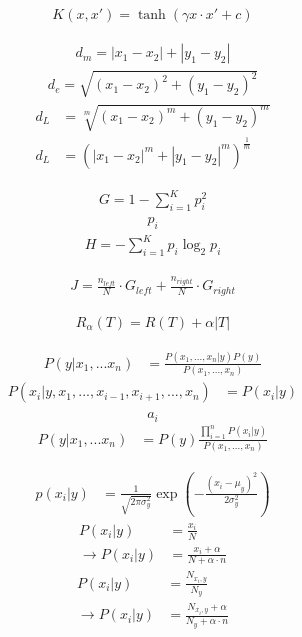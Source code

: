 \documentclass[USenglish,final,authoryear,12pt]{article}
\begin{document}
\begin{align*}
	K(x, x') = \tanh(\gamma x\cdot x' + c)
\end{align*}

\begin{align*}
	d_m = |x_1-x_2| + |y_1 - y_2|
\end{align*}
\begin{align*}
	d_e = \sqrt{(x_1-x_2)^2 + (y_1 - y_2)^2}
\end{align*}
\begin{align*}
	d_L &= \sqrt[m]{(x_1-x_2)^m + (y_1 - y_2)^m}\\
	d_L &= \left(|x_1-x_2|^m + |y_1 - y_2|^m\right)^{\frac{1}{m}}
\end{align*}

\begin{align*}
	G = 1 - \sum_{i = 1}^{K}p^2_i
\end{align*}
\begin{align*}
	p_i
\end{align*}
\begin{align*}
	H = - \sum_{i = 1}^{K}p_i\log_2 p_i
\end{align*}

\begin{align*}
	J = \frac{n_{left}}{N}\cdot G_{left} + \frac{n_{right}}{N}\cdot G_{right}
\end{align*}


\begin{align*}
	R_\alpha(T) = R(T) + \alpha |T|
\end{align*}

\begin{align*}
	P(y|x_1,...x_n) &= \frac{P(x_1, ... ,x_n|y)P(y)}{P(x_1,...,x_n)}
\end{align*}
\begin{align*}
	P(x_i|y,x_1,...,x_{i-1},x_{i+1},...,x_n) &= P(x_i|y)\\
\end{align*}
\begin{equation*}
 a_{i}
\end{equation*}
\begin{align*}
	P(y|x_1,...x_n) &= P(y)\frac{\prod_{i=1}^{n}P(x_i|y)}{P(x_1,...,x_n)}
\end{align*}

\begin{align*}
	p(x_i|y) &= \frac{1}{\sqrt{2\pi\sigma_y^2}}\exp\left(-\frac{(x_i-\mu_y)^2}{2\sigma_y^2}\right)
\end{align*}
\begin{align*}
	P(x_i|y) &= \frac{x_i}{N}\\
	\to P(x_i|y) &= \frac{x_i + \alpha}{N + \alpha\cdot n}
\end{align*}
\begin{align*}
	P(x_i|y) &= \frac{N_{x_i,y}}{N_y}\\
	\to P(x_i|y) &= \frac{N_{x_i,y} + \alpha}{N_y + \alpha\cdot n}
\end{align*}
\end{document}
